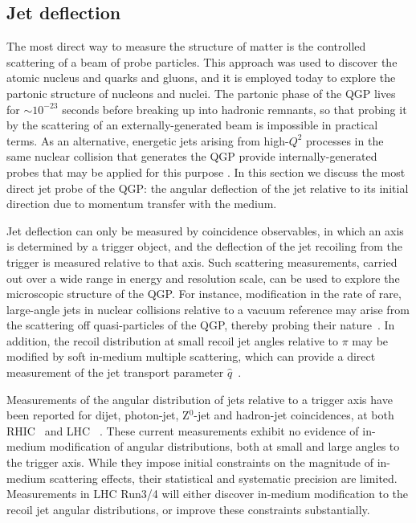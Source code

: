 \subsection{Jet deflection}
The most direct way to measure the structure of matter is the controlled scattering of a beam of probe particles. This approach was used to discover the atomic nucleus and quarks and gluons, and it is employed today to explore the partonic structure of nucleons and nuclei. The partonic phase of the QGP lives for $\sim10^{-23}$ seconds before breaking up into hadronic remnants, so that probing it by the scattering of an externally-generated beam is impossible in practical terms. 
As an alternative, energetic jets arising from high-$Q^2$ processes in the same nuclear collision that generates the QGP provide internally-generated probes that may be applied for this purpose \cite{Bjorken:1982tu,Gyulassy:1990ye,Baier:1994bd,Zakharov:2018rst,Gyulassy:1999zd,Wiedemann:2009sh}. 
In this section we discuss the most direct jet probe of the QGP: the angular deflection of the jet relative to its initial direction due to momentum transfer with the medium. 

Jet deflection can only be measured by coincidence observables, in which an axis is determined by a trigger object, and the deflection of the jet recoiling from the trigger is measured relative to that axis. Such scattering measurements, carried out over a wide range in energy and resolution scale, can be used to explore the microscopic structure of the QGP. For instance, modification in the rate of rare, large-angle jets in nuclear collisions relative to a vacuum reference may arise from the scattering off quasi-particles of the QGP, thereby probing their nature~\cite{DEramo:2012uzl}. In addition, the recoil distribution at small recoil jet angles relative to $\pi$ may be modified by soft in-medium multiple scattering, which can provide a direct measurement of the jet transport parameter $\hat{q}$~\cite{Chen:2016vem}.

Measurements of the angular distribution of jets relative to a trigger axis have been reported for dijet, photon-jet, Z$^{0}$-jet and hadron-jet coincidences, at both RHIC~\cite{Adamczyk:2017yhe} and LHC ~\cite{Adam:2015doa,Sirunyan:2017jic,Sirunyan:2017qhf,Chatrchyan:2012nia,Aaboud:2017eww}. These current measurements exhibit no evidence of in-medium modification of angular distributions, both at small and large angles to the trigger axis. While they impose initial constraints on the magnitude of in-medium scattering effects, their statistical and systematic precision are limited. Measurements in LHC Run3/4 will either discover in-medium modification to the recoil jet angular distributions, or improve these constraints substantially.

